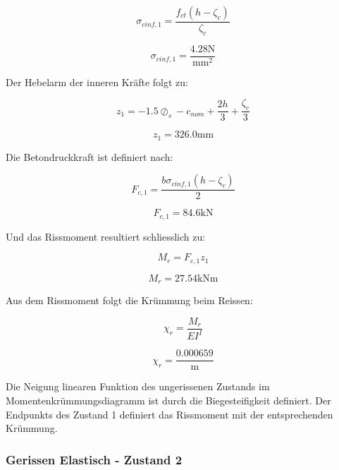 \documentclass[
  letterpaper,
]{scrreprt}
\begin{document}
\begin{equation}\sigma_{c inf,1} = \frac{f_{ct} \left(h - \zeta_{c}\right)}{\zeta_{c}}\end{equation}

\begin{equation}\sigma_{c inf,1} = \frac{4.28 \text{N}}{\text{mm}^{2}}\end{equation}

Der Hebelarm der inneren Kräfte folgt zu:

\begin{equation}z_{1} = - 1.5 \oslash_{s} - c_{nom} + \frac{2 h}{3} + \frac{\zeta_{c}}{3}\end{equation}

\begin{equation}z_{1} = 326.0 \text{mm}\end{equation}

Die Betondruckkraft ist definiert nach:

\begin{equation}F_{c,1} = \frac{b \sigma_{c inf,1} \left(h - \zeta_{c}\right)}{2}\end{equation}

\begin{equation}F_{c,1} = 84.6 \text{kN}\end{equation}

Und das Rissmoment resultiert schliesslich zu:

\begin{equation}M_{r} = F_{c,1} z_{1}\end{equation}

\begin{equation}M_{r} = 27.54 \text{kN} \text{m}\end{equation}

Aus dem Rissmoment folgt die Krümmung beim Reissen:

\begin{equation}\chi_{r} = \frac{M_{r}}{EI^{I}}\end{equation}

\begin{equation}\chi_{r} = \frac{0.000659}{\text{m}}\end{equation}

Die Neigung linearen Funktion des ungerissenen Zustands im
Momentenkrümmungsdiagramm ist durch die Biegesteifigkeit definiert. Der
Endpunkts des Zustand 1 definiert das Rissmoment mit der entsprechenden
Krümmung.

\hypertarget{gerissen-elastisch---zustand-2-1}{%
\subsubsection{Gerissen Elastisch - Zustand
2}\label{gerissen-elastisch---zustand-2-1}}
\end{document}
